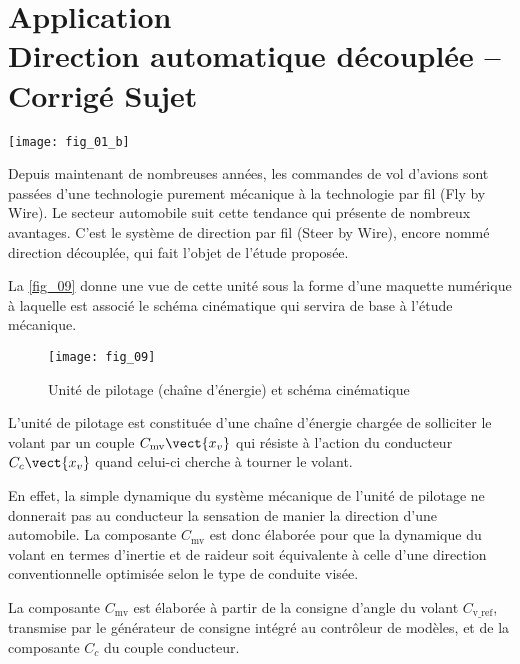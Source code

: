 \chapter*{Application  \\ 
Direction automatique découplée -- \ifprof Corrigé \else Sujet \fi}
\ifprof {} \else  \fi
\setcounter{question}{0}

\begin{marginfigure}
\texttt{[image: fig\_01\_b]}
\end{marginfigure}


\ifprof
\else
Depuis maintenant de nombreuses années, les commandes de vol d'avions sont passées d'une
technologie purement mécanique à la technologie par fil (Fly by Wire). Le secteur automobile suit cette
tendance qui présente de nombreux avantages. C'est le système de direction par fil (Steer by Wire), encore nommé direction découplée, qui fait l'objet de l'étude proposée.


La \autoref{fig_09} donne une vue de cette unité sous la forme d'une maquette numérique à laquelle est
associé le schéma cinématique qui servira de base à l'étude mécanique.

\begin{figure}[H]
\centering
\texttt{[image: fig\_09]}

\caption{Unité de pilotage (chaîne d'énergie) et schéma cinématique  \label{fig_09}}
\end{figure}

L'unité de pilotage est constituée d'une chaîne d'énergie chargée de solliciter le volant par un
couple $C_{\text{mv}} \vect{x_v}$ qui résiste à l'action du conducteur $C_{c} \vect{x_v}$
quand celui-ci cherche à tourner le volant.

En effet, la simple dynamique du système mécanique de l'unité de pilotage ne donnerait pas au
conducteur la sensation de manier la direction d'une automobile. La composante $C_{\text{mv}}$ est donc élaborée pour que la dynamique du volant en termes d'inertie et de raideur soit équivalente à celle d'une direction conventionnelle optimisée selon le type de conduite visée.

La composante $C_{\text{mv}}$ est élaborée à partir de la consigne d'angle du volant $C_{\text{v\_ref}}$, transmise par le
générateur de consigne intégré au contrôleur de modèles, et de la composante $C_c$ du couple
conducteur.

